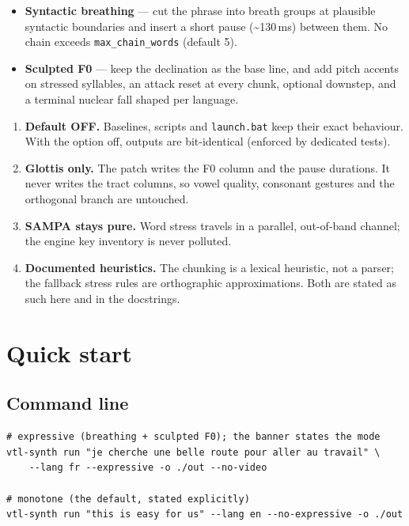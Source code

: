\documentclass[11pt,a4paper]{article}
\begin{document}
\begin{itemize}[itemsep=2pt]
\item \textbf{Syntactic breathing} --- cut the phrase into breath
  groups at plausible syntactic boundaries and insert a short pause
  (\textasciitilde 130\,ms) between them. No chain exceeds
  \texttt{max\_chain\_words} (default 5).
\item \textbf{Sculpted F0} --- keep the declination as the base
  line, and add pitch accents on stressed syllables, an attack
  reset at every chunk, optional downstep, and a terminal nuclear
  fall shaped per language.
\end{itemize}

\begin{callout}
\begin{enumerate}[itemsep=1pt]
\item \textbf{Default OFF.} Baselines, scripts and \texttt{launch.bat}
  keep their exact behaviour. With the option off, outputs are
  bit-identical (enforced by dedicated tests).
\item \textbf{Glottis only.} The patch writes the F0 column and the
  pause durations. It never writes the tract columns, so vowel
  quality, consonant gestures and the orthogonal branch are
  untouched.
\item \textbf{SAMPA stays pure.} Word stress travels in a parallel,
  out-of-band channel; the engine key inventory is never polluted.
\item \textbf{Documented heuristics.} The chunking is a lexical
  heuristic, not a parser; the fallback stress rules are
  orthographic approximations. Both are stated as such here and in
  the docstrings.
\end{enumerate}
\end{callout}

\section{Quick start}\label{sec:quickstart}

\subsection{Command line}

\begin{lstlisting}[style=shell]
# expressive (breathing + sculpted F0); the banner states the mode
vtl-synth run "je cherche une belle route pour aller au travail" \
    --lang fr --expressive -o ./out --no-video

# monotone (the default, stated explicitly)
vtl-synth run "this is easy for us" --lang en --no-expressive -o ./out
\end{lstlisting}
\end{document}
